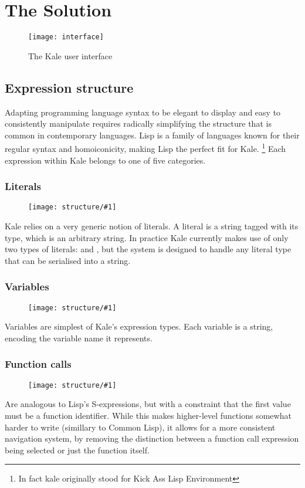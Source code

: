 \chapter{The Solution}

\begin{figure}[t]
\texttt{[image: interface]}
\caption{The Kale user interface}
\end{figure}


\section{Expression structure}

Adapting programming language syntax to be elegant to display and easy to
consistently manipulate requires radically simplifying the structure that is
common in contemporary languages. Lisp \citep{McCarthy1960} is a family of
languages known for their regular syntax and homoiconicity, making Lisp the
perfect fit for Kale.%
\footnote{In fact kale originally stood for Kick Ass Lisp Environment}
Each expression within Kale belongs to one of five categories.

\newcommand{\exprfig}[1]{
	\begin{figure}[H]
		\texttt{[image: structure/\#1]}
	\end{figure}
	\smallskip
	\noindent
}
\subsection{Literals}
\label{expr:literal}
\exprfig{literal}
Kale relies on a very generic notion of literals. A literal is a string
tagged with its type, which is an arbitrary string. In practice Kale currently
makes use of only two types of literals:  and , but the
system is designed to handle any literal type that can be serialised into a
string.

\subsection{Variables}
\label{expr:variable}
\exprfig{variable}
Variables are simplest of Kale's expression types. Each variable is a string,
encoding the variable name it represents. 

\subsection{Function calls}
\label{expr:function}
\exprfig{function}
Are analogous to Lisp's S-expressions, but with a constraint that the first
value must be a function identifier. While this makes higher-level functions
somewhat harder to write (simillary to Common Lisp), it allows for a more
consistent navigation system, by removing the distinction between a function
call expression being selected or just the function itself.

